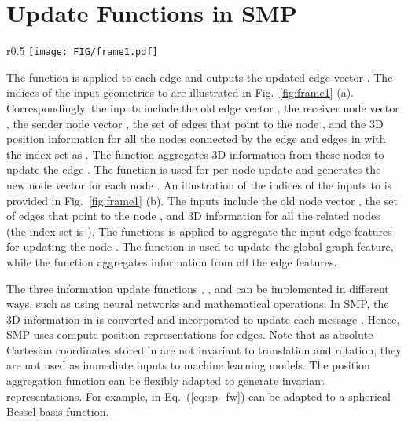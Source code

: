\documentclass{article}
\begin{document}
\section{Update Functions in SMP}  \label{sec:supp_A}
\begin{wrapfigure}[14]{r}{0.5\textwidth}\vspace{-0.2cm}
    \texttt{[image: FIG/frame1.pdf]}
    \vspace{-10 pt}
    \caption{Illustrations of the functions  (a) and  (b).
}\label{fig:frame1}
    \vspace{-10 pt}
\end{wrapfigure}
The function  is applied to each edge  and outputs the updated edge vector . The indices of the
input geometries to  are illustrated in Fig.~\ref{fig:frame1} (a).
Correspondingly, the inputs 
include the old edge vector , the receiver node vector , the sender node vector , the set of edges  that point to the node  , and the 3D position information for all the nodes connected by the edge  and edges in  with the index set as . 
The function  aggregates 3D information from these nodes to update the edge .
The function  is used for per-node update and generates the new node vector 
 for each node . An illustration of the indices of the inputs to  is provided in Fig.~\ref{fig:frame1} (b). The inputs include the old node vector , the set of edges  that point to the node , and 3D information for all the related nodes (the index set is ). 
The functions  is applied to aggregate the input edge features for updating the node .
The function  is used to update the global graph feature, while the function  aggregates information from all the edge features.

The three information update functions , , and 
can be implemented in different ways, such as using neural networks and mathematical operations.
In SMP, the 3D information in  is converted and incorporated to
update each message . Hence,
SMP uses  compute position representations for edges. 
Note that as absolute Cartesian coordinates stored in 
are not invariant to translation and rotation,
they are not used as immediate inputs to machine learning models.
The position aggregation function can be flexibly adapted to generate invariant representations. For example,  in Eq.~(\ref{eq:sp_fw}) can be adapted to a spherical Bessel basis function.
\end{document}
